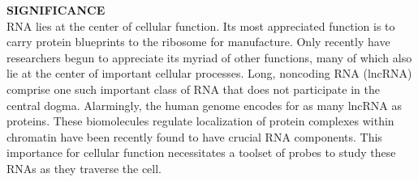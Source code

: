 

%

\textbf{SIGNIFICANCE}\\
RNA lies at the center of cellular function. Its most appreciated function is to carry protein blueprints to the ribosome for manufacture. Only recently have researchers begun to appreciate its myriad of other functions, many of which also lie at the center of important cellular processes.\cite{CechNoncodingRNARevolution2014}
Long, noncoding RNA (lncRNA) comprise one such important class of RNA that does not participate in the central dogma.\cite{RinnGenomeRegulationLong2012} Alarmingly, the human genome encodes for as many lncRNA as proteins.\cite{Rinntranscriptionalactivityhuman2003} These biomolecules regulate localization of protein complexes within chromatin
 have been recently found to have crucial RNA components.
This importance for cellular function necessitates a toolset of probes to study these RNAs as they traverse the cell.


